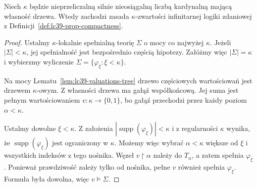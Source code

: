 \begin{twierdzenie}
\label{thm:lc39-tree-to-compactness}
Niech $\kappa$ będzie nieprzeliczalną
silnie nieosiągalną liczbą
kardynalną mającą własność drzewa.
Wtedy zachodzi zasada
$\kappa$-zwartości infinitarnej
logiki zdaniowej z
Definicji~\ref{def:lc39-prop-compactness}.
\end{twierdzenie}
\begin{proof}
Ustalmy $\kappa$-lokalnie
spełnialną teorię $\Sigma$
o mocy co najwyżej $\kappa$.
Jeżeli $|\Sigma|<\kappa$,
jej spełnialność jest
bezpośrednio częścią hipotezy.
Załóżmy więc $|\Sigma|=\kappa$
i wybierzmy wyliczenie
$\Sigma=\{\varphi_\xi:\xi<\kappa\}$.

Na mocy
Lematu~\ref{lem:lc39-valuations-tree}
drzewo częściowych wartościowań
jest drzewem $\kappa$-owym.
Z własności drzewa ma gałąź
współkońcową. Jej suma
jest pełnym wartościowaniem
$v:\kappa\to\{0,1\}$,
bo gałąź przechodzi przez
każdy poziom $\alpha<\kappa$.

Ustalmy dowolne $\xi<\kappa$.
Z założenia
$|\operatorname{supp}(\varphi_\xi)|
 <\kappa$ i z regularności
$\kappa$ wynika, że
$\operatorname{supp}(\varphi_\xi)$
jest ograniczony w $\kappa$.
Możemy więc wybrać
$\alpha<\kappa$ większe od
$\xi$ i wszystkich
indeksów z tego nośnika.
Węzeł $v\restriction\alpha$
należy do $T_\alpha$,
a zatem spełnia
$\varphi_\xi$.
Ponieważ prawdziwość
zależy tylko od nośnika,
pełne $v$ również spełnia
$\varphi_\xi$.
Formuła była dowolna,
więc $v\models\Sigma$.
\end{proof}


